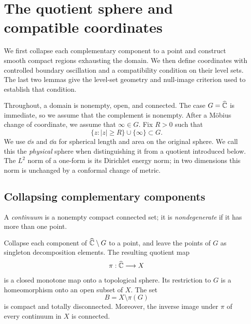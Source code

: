 \section{The quotient sphere and compatible coordinates}\label{sec:setup}

We first collapse each complementary component to a point and construct
smooth compact regions exhausting the domain.  We then define
coordinates with controlled boundary oscillation and a
compatibility condition on their level sets.  The last two lemmas give
the level-set geometry and null-image criterion used to establish that
condition.

Throughout, a domain is nonempty, open, and connected.  The case
$G=\widehat{\mathbb C}$ is immediate, so we assume that the complement is nonempty.
After a M\"obius change of coordinate, we assume that
$\infty\in G$.  Fix $R>0$ such that
\[
 \{z:|z|\ge R\}\cup\{\infty\}\subset G.
\]
We use $\dd s$ and $\dd a$ for spherical length and area on the original
sphere.  We call this the \emph{physical} sphere when distinguishing it
from a quotient introduced below.  The $L^2$ norm of a one-form is its
Dirichlet energy norm; in two dimensions this norm is unchanged by a
conformal change of metric.

\subsection{Collapsing complementary components}

A \emph{continuum} is a nonempty compact connected set; it is
\emph{nondegenerate} if it has more than one point.

\begin{lemma}\label{lem:quotient}
Collapse each component of $\widehat{\mathbb C}\setminus G$ to a point, and leave
the points of $G$ as singleton decomposition elements.  The resulting
quotient map
\[
 \pi:\widehat{\mathbb C}\longrightarrow X
\]
is a closed monotone map onto a topological sphere.  Its restriction to
$G$ is a homeomorphism onto an open subset of $X$.  The set
\[
 B=X\setminus\pi(G)
\]
is compact and totally disconnected.  Moreover, the inverse image under
$\pi$ of every continuum in $X$ is connected.
\end{lemma}

